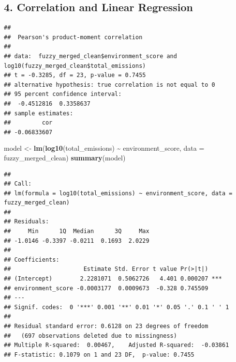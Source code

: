 \documentclass[
]{article}
\newenvironment{Shaded}{\begin{snugshade}}{\end{snugshade}}
\newcommand{\AttributeTok}[1]{\textcolor[rgb]{0.13,0.29,0.53}{#1}}
\newcommand{\FunctionTok}[1]{\textcolor[rgb]{0.13,0.29,0.53}{\textbf{#1}}}
\newcommand{\NormalTok}[1]{#1}
\newcommand{\OtherTok}[1]{\textcolor[rgb]{0.56,0.35,0.01}{#1}}
\newcommand{\SpecialCharTok}[1]{\textcolor[rgb]{0.81,0.36,0.00}{\textbf{#1}}}
\begin{document}
\hypertarget{correlation-and-linear-regression}{%
\subsection{4. Correlation and Linear
Regression}\label{correlation-and-linear-regression}}

\begin{Shaded}
\end{Shaded}

\begin{verbatim}
## 
##  Pearson's product-moment correlation
## 
## data:  fuzzy_merged_clean$environment_score and log10(fuzzy_merged_clean$total_emissions)
## t = -0.3285, df = 23, p-value = 0.7455
## alternative hypothesis: true correlation is not equal to 0
## 95 percent confidence interval:
##  -0.4512816  0.3358637
## sample estimates:
##         cor 
## -0.06833607
\end{verbatim}

\begin{Shaded}
\begin{Highlighting}[]
\NormalTok{model }\OtherTok{\textless{}{-}} \FunctionTok{lm}\NormalTok{(}\FunctionTok{log10}\NormalTok{(total\_emissions) }\SpecialCharTok{\textasciitilde{}}\NormalTok{ environment\_score, }\AttributeTok{data =}\NormalTok{ fuzzy\_merged\_clean)}
\FunctionTok{summary}\NormalTok{(model)}
\end{Highlighting}
\end{Shaded}

\begin{verbatim}
## 
## Call:
## lm(formula = log10(total_emissions) ~ environment_score, data = fuzzy_merged_clean)
## 
## Residuals:
##     Min      1Q  Median      3Q     Max 
## -1.0146 -0.3397 -0.0211  0.1693  2.0229 
## 
## Coefficients:
##                     Estimate Std. Error t value Pr(>|t|)    
## (Intercept)        2.2281071  0.5062726   4.401 0.000207 ***
## environment_score -0.0003177  0.0009673  -0.328 0.745509    
## ---
## Signif. codes:  0 '***' 0.001 '**' 0.01 '*' 0.05 '.' 0.1 ' ' 1
## 
## Residual standard error: 0.6128 on 23 degrees of freedom
##   (697 observations deleted due to missingness)
## Multiple R-squared:  0.00467,    Adjusted R-squared:  -0.03861 
## F-statistic: 0.1079 on 1 and 23 DF,  p-value: 0.7455
\end{verbatim}
\end{document}
